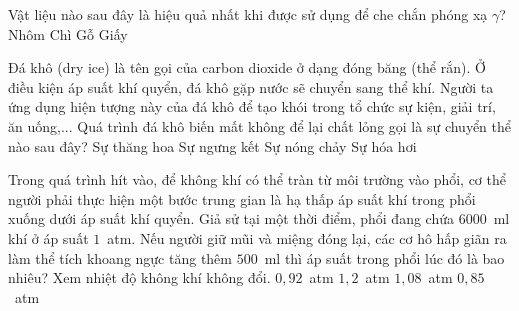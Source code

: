 	\begin{ex}%
		Vật liệu nào sau đây là hiệu quả nhất khi được sử dụng để che chắn phóng xạ $\gamma$?
		\choice
		{Nhôm}
		{\True Chì}
		{Gỗ}
		{Giấy}
	\end{ex}

	\begin{ex}%
		Đá khô (dry ice) là tên gọi của carbon dioxide ở dạng đóng băng (thể rắn). Ở điều kiện áp suất khí quyển, đá khô gặp nước sẽ chuyển sang thể khí. Người ta ứng dụng hiện tượng này của đá khô để tạo khói trong tổ chức sự kiện, giải trí, ăn uống,... Quá trình đá khô biến mất không để lại chất lỏng gọi là sự chuyển thể nào sau đây?
		\choice
		{\True Sự thăng hoa}
		{Sự ngưng kết}
		{Sự nóng chảy}
		{Sự hóa hơi}
	\end{ex}

	\begin{ex}%
		Trong quá trình hít vào, để không khí có thể tràn từ môi trường vào phổi, cơ thể người phải thực hiện một bước trung gian là hạ thấp áp suất khí trong phổi xuống dưới áp suất khí quyển. Giả sử tại một thời điểm, phổi đang chứa $6000$~ml khí ở áp suất $1$~atm. Nếu người giữ mũi và miệng đóng lại, các cơ hô hấp giãn ra làm thể tích khoang ngực tăng thêm $500$~ml thì áp suất trong phổi lúc đó là bao nhiêu? Xem nhiệt độ không khí không đổi.
		\choice
		{\True $0{,}92$~atm}
		{$1{,}2$~atm}
		{$1{,}08$~atm}
		{$0{,}85$~atm}
	\end{ex}


